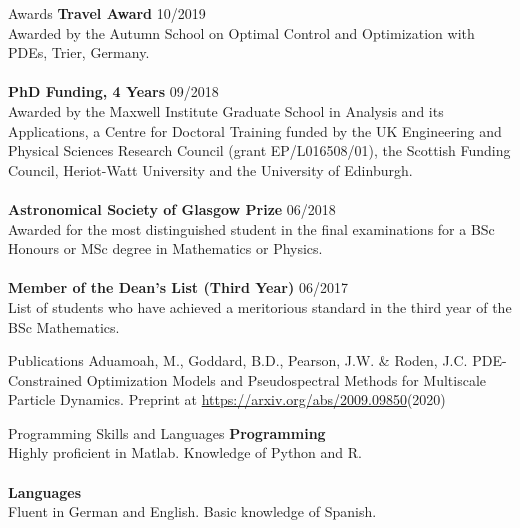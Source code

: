 \documentclass{resume} %
\begin{document}
\begin{rSection}{Awards}
	{\bf Travel Award}   \hfill{10/2019}	\\
	Awarded by the Autumn School on Optimal Control and Optimization with PDEs, Trier, Germany. \\
	\\
	{\bf PhD Funding, 4 Years} \hfill{09/2018}\\	
	Awarded by the Maxwell Institute Graduate School in Analysis and its Applications, a Centre for Doctoral Training funded by the UK Engineering and Physical Sciences Research Council (grant EP/L016508/01), the Scottish Funding Council, Heriot-Watt University and the University of Edinburgh.\\
	\\
	{\bf Astronomical Society of Glasgow Prize} \hfill{06/2018}\\ 
	Awarded for the most distinguished student in the final examinations for a BSc Honours or MSc degree in Mathematics or Physics.\\
	\\
	{\bf Member of the Dean’s List (Third Year)} \hfill{06/2017}\\
	List of students who have achieved a meritorious standard in the third year of the BSc Mathematics.
	
\end{rSection}


\begin{rSection}{Publications}
	Aduamoah, M., Goddard, B.D., Pearson, J.W. \& Roden, J.C. PDE-Constrained Optimization Models and Pseudospectral Methods for Multiscale Particle Dynamics. Preprint at \url{https://arxiv.org/abs/2009.09850}(2020)
\end{rSection}	
	
\begin{rSection}{Programming Skills and Languages}
	{\bf Programming}\\
	Highly proficient in Matlab. Knowledge of Python and R.\\
	\\
	{\bf Languages}\\
	Fluent in German and English. Basic knowledge of Spanish.
\end{rSection}

	
\end{document}
